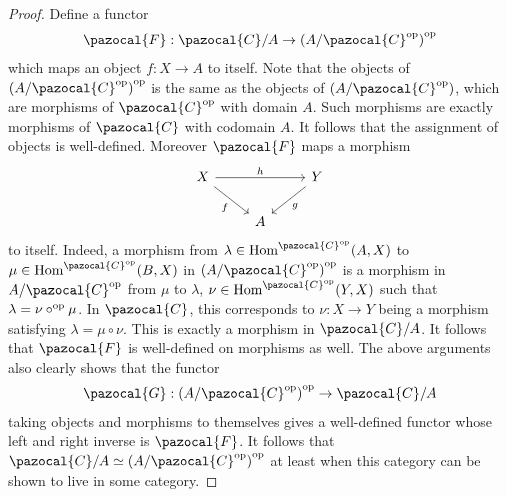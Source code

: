 \begin{proof}
    Define a functor 
    \begin{gather*}
        \pazocal{F} : \pazocal{C}/A \rightarrow \left(A/\pazocal{C}\op\right)\op
    \end{gather*}
    which maps an object $f: X\rightarrow A$ to itself. Note that the objects of $\left(A/\pazocal{C}\op\right)\op$ is the same as the objects of $\left(A/\pazocal{C}\op\right)$, which are morphisms of $\pazocal{C}\op$ with domain $A$. Such morphisms are exactly morphisms of $\pazocal{C}$ with codomain $A$. It follows that the assignment of objects is well-defined. Moreover $\pazocal{F}$ maps a morphism  
    $$
        \begin{tikzcd}
            X \arrow[rd, "f"'] \arrow[rr, "h"] & & Y\arrow[ld, "g"]\\
            & A 
        \end{tikzcd}
    $$ 
    to itself. Indeed, a morphism from $\lambda\in \Hom^{\pazocal{C}\op}(A,X)$ to $\mu\in \Hom^{\pazocal{C}\op}(B,X)$ in $\left(A/\pazocal{C}\op\right)\op$ is a morphism in $A/\pazocal{C}\op$ from $\mu$ to $\lambda$, $\nu\in \Hom^{\pazocal{C}\op}(Y,X)$ such that $\lambda = \nu\circ^\mathrm{op}\mu$. In $\pazocal{C}$, this corresponds to $\nu: X\rightarrow Y$ being a morphism satisfying $\lambda = \mu\circ \nu$. This is exactly a morphism in $\pazocal{C}/A$. It follows that $\pazocal{F}$ is well-defined on morphisms as well. The above arguments also clearly shows that the functor 
    \begin{gather*}
        \pazocal{G}: \left(A/\pazocal{C}\op\right)\op \rightarrow \pazocal{C}/A 
    \end{gather*}
    taking objects and morphisms to themselves gives a well-defined functor whose left and right inverse is $\pazocal{F}$. It follows that $\pazocal{C}/A\simeq \left(A/\pazocal{C}\op\right)\op$ at least when this category can be shown to live in some category.  
\end{proof}
